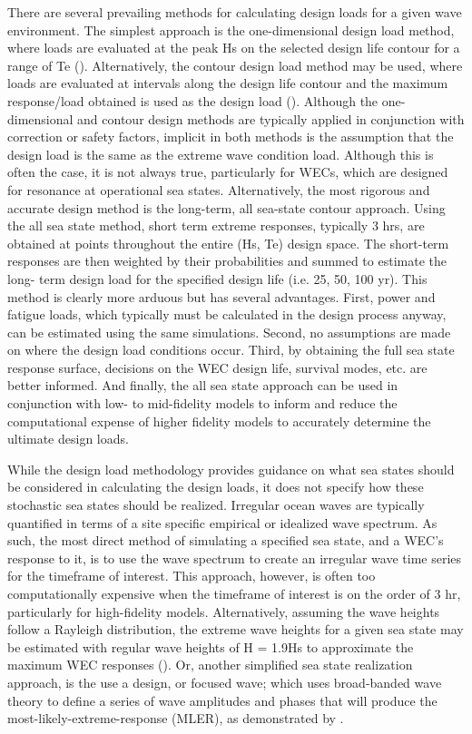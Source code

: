 There are several prevailing methods for calculating design loads for a given wave environment. The simplest approach is the one-dimensional design load method, where loads are evaluated at the peak Hs on the selected design life contour for a range of Te (\cite{IECTS62600-2,N-003}). Alternatively, the contour design load method may be used, where loads are evaluated at intervals along the design life contour and the maximum response/load obtained is used as the design load (\cite{N-003,DNV-RP-C205}). Although the one-dimensional and contour design methods are typically applied in conjunction with correction or safety factors, implicit in both methods is the assumption that the design load is the same as the extreme wave condition load. Although this is often the case, it is not always true, particularly for WECs, which are designed for resonance at operational sea states. Alternatively, the most rigorous and accurate design method is the long-term, all sea-state contour approach. Using the all sea state method, short term extreme responses, typically 3 hrs, are obtained at points throughout the entire (Hs, Te) design space. The short-term responses are then weighted by their probabilities and summed to estimate the long- term design load for the specified design life (i.e. 25, 50, 100 yr). This method is clearly more arduous but has several advantages. First, power and fatigue loads, which typically must be calculated in the design process anyway, can be estimated using the same simulations. Second, no assumptions are made on where the design load conditions occur. Third, by obtaining the full sea state response surface, decisions on the WEC design life, survival modes, etc. are better informed. And finally, the all sea state approach can be used in conjunction with low- to mid-fidelity models to inform and reduce the computational expense of higher fidelity models to accurately determine the ultimate design loads.

While the design load methodology provides guidance on what sea states should be considered in calculating the design loads, it does not specify how these stochastic sea states should be realized. Irregular ocean waves are typically quantified in terms of a site specific empirical or idealized wave spectrum. As such, the most direct method of simulating a specified sea state, and a WEC's response to it, is to use the wave spectrum to create an irregular wave time series for the timeframe of interest. This approach, however, is often too computationally expensive when the timeframe of interest is on the order of 3 hr, particularly for high-fidelity models. Alternatively, assuming the wave heights follow a Rayleigh distribution, the extreme wave heights for a given sea state may be estimated with regular wave heights of H = 1.9Hs to approximate the maximum WEC responses (\cite{N-003}). Or, another simplified sea state realization approach, is the use a design, or focused wave; which uses broad-banded wave theory to define a series of wave amplitudes and phases that will produce the most-likely-extreme-response (MLER), as demonstrated by \cite{Quon2016}.

